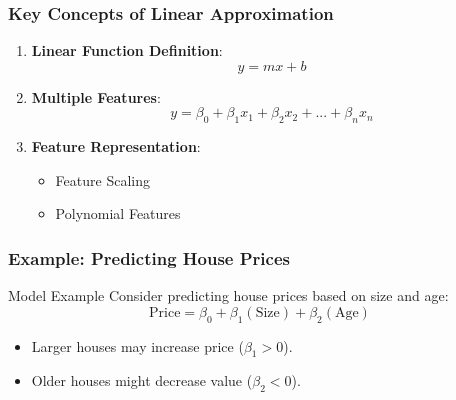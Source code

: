 \documentclass[aspectratio=169]{beamer}
\begin{document}
\begin{frame}[fragile]
    \frametitle{Key Concepts of Linear Approximation}
    \begin{enumerate}
        \item \textbf{Linear Function Definition}:
        \begin{equation}
            y = mx + b
        \end{equation}
        \item \textbf{Multiple Features}:
        \begin{equation}
            y = \beta_0 + \beta_1 x_1 + \beta_2 x_2 + ... + \beta_n x_n
        \end{equation}
        \item \textbf{Feature Representation}:
        \begin{itemize}
            \item Feature Scaling
            \item Polynomial Features
        \end{itemize}
    \end{enumerate}
\end{frame}

\begin{frame}[fragile]
    \frametitle{Example: Predicting House Prices}
    \begin{block}{Model Example}
        Consider predicting house prices based on size and age:
        \begin{equation}
            \text{Price} = \beta_0 + \beta_1 (\text{Size}) + \beta_2 (\text{Age})
        \end{equation}
    \end{block}
    \begin{itemize}
        \item Larger houses may increase price (\(\beta_1 > 0\)).
        \item Older houses might decrease value (\(\beta_2 < 0\)).
    \end{itemize}
\end{frame}
\end{document}

